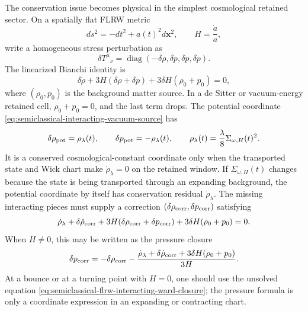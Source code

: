 \begin{controlledapproximation}
\label{ca:semiclassical-flrw-interacting-source-noise-closure}
The conservation issue becomes physical in the simplest cosmological retained
sector.  On a spatially flat FLRW metric
\[
  ds^2=-dt^2+a(t)^2d\mathbf x^2,
  \qquad H=\frac{\dot a}{a},
\]
write a homogeneous stress perturbation as
\begin{equation}
  \delta T^\mu{}_\nu
  =
  \operatorname{diag}(-\delta\rho,\delta p,\delta p,\delta p).
  \label{eq:semiclassical-flrw-homogeneous-source}
\end{equation}
The linearized Bianchi identity is
\begin{equation}
  \delta\dot\rho
  +
  3H(\delta\rho+\delta p)
  +
  3\delta H(\rho_0+p_0)
  =
  0 ,
  \label{eq:semiclassical-flrw-linear-ward}
\end{equation}
where \((\rho_0,p_0)\) is the background matter source.  In a de Sitter or
vacuum-energy retained cell, \(\rho_0+p_0=0\), and the last term drops.  The
potential coordinate
\eqref{eq:semiclassical-interacting-vacuum-source} has
\[
  \delta\rho_{\rm pot}=\rho_\lambda(t),
  \qquad
  \delta p_{\rm pot}=-\rho_\lambda(t),
  \qquad
  \rho_\lambda(t)=\frac{\lambda}{8}\Sigma_{\omega,H}(t)^2 .
\]
It is a conserved cosmological-constant coordinate only when the transported
state and Wick chart make \(\dot\rho_\lambda=0\) on the retained window.  If
\(\Sigma_{\omega,H}(t)\) changes because the state is being transported
through an expanding background, the potential coordinate by itself has
conservation residual \(\dot\rho_\lambda\).  The missing interacting pieces
must supply a correction
\((\delta\rho_{\rm corr},\delta p_{\rm corr})\) satisfying
\begin{equation}
  \dot\rho_\lambda
  +
  \delta\dot\rho_{\rm corr}
  +
  3H(\delta\rho_{\rm corr}+\delta p_{\rm corr})
  +
  3\delta H(\rho_0+p_0)
  =
  0 .
  \label{eq:semiclassical-flrw-interacting-ward-closure}
\end{equation}
When \(H\ne0\), this may be written as the pressure closure
\begin{equation}
  \delta p_{\rm corr}
  =
  -\delta\rho_{\rm corr}
  -
  \frac{
    \dot\rho_\lambda+\delta\dot\rho_{\rm corr}
    +3\delta H(\rho_0+p_0)
  }{3H}.
  \label{eq:semiclassical-flrw-pressure-closure}
\end{equation}
At a bounce or at a turning point with \(H=0\), one should use the unsolved
equation \eqref{eq:semiclassical-flrw-interacting-ward-closure}; the pressure
formula is only a coordinate expression in an expanding or contracting chart.


\end{controlledapproximation}
